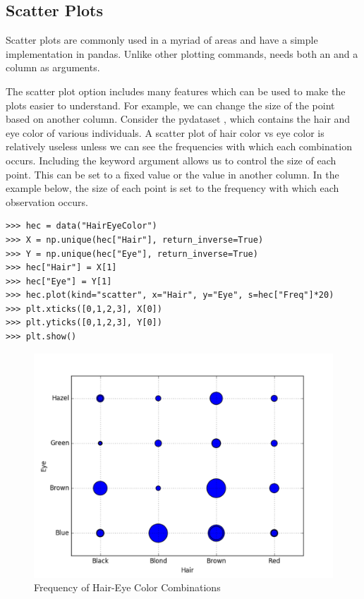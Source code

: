 \subsection*{Scatter Plots}

Scatter plots are commonly used in a myriad of areas and have a simple implementation in pandas. Unlike other plotting commands,  needs both an  and a  column as arguments.

The scatter plot option includes many features which can be used to make the plots easier to understand.  For example, we can change the size of the point based on another column.  Consider the pydataset , which contains the hair and eye color of various individuals. A scatter plot of hair color vs eye color is relatively useless unless we can see the frequencies with which each combination occurs.  Including the keyword argument  allows us to control the size of each point.  This can be set to a fixed value or the value in another column.  In the example below, the size of each point is set to the frequency with which each observation occurs.

\begin{lstlisting}
>>> hec = data("HairEyeColor")
>>> X = np.unique(hec["Hair"], return_inverse=True)
>>> Y = np.unique(hec["Eye"], return_inverse=True)
>>> hec["Hair"] = X[1]
>>> hec["Eye"] = Y[1]
>>> hec.plot(kind="scatter", x="Hair", y="Eye", s=hec["Freq"]*20)
>>> plt.xticks([0,1,2,3], X[0])
>>> plt.yticks([0,1,2,3], Y[0])
>>> plt.show()
\end{lstlisting}

\begin{figure}[H]
    \centering
    \includegraphics[width=.75\textwidth]{HairEyeColorscatter.pdf}
    \caption{Frequency of Hair-Eye Color Combinations}
\end{figure}


